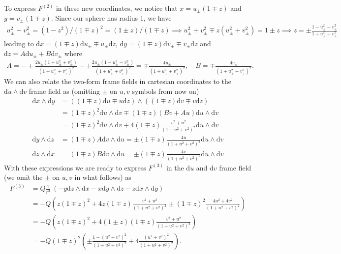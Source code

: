 \documentclass[10pt, a4paper]{article}
\begin{document}
{\begin{enumerate}
  To express $F^{(2)}$ in these new coordinates, we notice that $x = u_\pm (1\mp z)$ and $y = v_\pm (1\mp z)$. Since our sphere has radius 1, we have 
  \begin{align*}
    u^2_\pm + v_\pm^2 = (1-z^2)/(1\mp z)^2 = (1 \pm z)/(1 \mp z) \implies u^2_\pm + v_\pm^2 \mp z(u^2_\pm + v_\pm^2)  = 1 \pm z\implies  z = \pm \frac{1 - u^2_\pm - v_\pm^2}{1 + u^2_\pm + v_\pm^2}
  \end{align*}
  leading to $\text{d}x = (1\mp z) \text{d}u_\pm \mp u_\pm \text{d}z$, $\text{d}y = (1\mp z) \text{d}v_\pm \mp v_\pm \text{d}z$ and $\text{d}z = A \text{d}u_\pm + B \text{d}v_\pm$
  where 
  \begin{align*}
    A = -\pm\frac{2u_\pm (1 + u^2_\pm + v_\pm^2)}{(1 + u^2_\pm + v_\pm^2)^2}-\pm\frac{2u_\pm(1 - u^2_\pm - v_\pm^2)}{(1 + u^2_\pm + v_\pm^2)^2} = \mp\frac{4u_\pm}{(1 + u^2_\pm + v_\pm^2)^2}, \quad B = \mp\frac{4v_\pm}{(1 + u^2_\pm + v_\pm^2)^2}.
  \end{align*}
  We can also relate the two-form frame fields in cartesian coordinates to the $\text{d}u \wedge \text{d}v$ frame field as (omitting $\pm$ on $u,v$ symbols from now on)
  \begin{align*}
    \text{d}x \wedge \text{d}y &= ((1\mp z) \text{d}u \mp u\text{d}z)\wedge((1\mp z) \text{d}v \mp v \text{d}z)\\ &= (1\mp z)^2 \text{d}u \wedge \text{d}v \mp (1\mp z)(Bv + Au)\text{d}u \wedge \text{d}v\\ &= (1 \mp z)^2 \text{d}u \wedge \text{d}v + 4(1\mp z)\frac{v^2 + u^2}{(1 + u^2 + v^2)^2}\text{d}u \wedge \text{d}v\\
    \text{d}y \wedge \text{d}z &= (1\mp z) A\text{d}v \wedge \text{d}u = \pm(1\mp z)\frac{4u}{(1 + u^2 + v^2)^2}\text{d}u \wedge \text{d}v\\
    \text{d}z \wedge \text{d}x &= (1\mp z) B\text{d}v \wedge \text{d}u = \pm(1\mp z)\frac{4v}{(1 + u^2 + v^2)^2}\text{d}u \wedge \text{d}v
  \end{align*}
  With these expressions we are ready to express $F^{(3)}$ in the $\text{d}u$ and $\text{d}v$ frame field (we omit the $\pm$ on $u, v$ in what follows) as 
  \begin{align*}
    F^{(3)} &=  Q \frac{1}{r^3}\ \left(-y\text{d}z \wedge \text{d}x - x\text{d}y \wedge \text{d}z - z\text{d}x \wedge \text{d} y\right)\\
    &= -Q \left(z(1 \mp z)^2  + 4z(1\mp z)\frac{v^2 + u^2}{(1 + u^2 + v^2)^2} \pm(1\mp z)^2\frac{4u^2 + 4v^2}{(1 + u^2 + v^2)^2}\right)\\
    &=-Q \left(z(1 \mp z)^2  + 4(1\pm z)(1\mp z)\frac{v^2 + u^2}{(1 + u^2 + v^2)^2}\right)\\
    &=-Q (1 \mp z)^2\left(\pm \frac{1 - (u^2 + v^2)^2}{(1 + u^2 + v^2)^2} + 4\frac{(u^2 + v^2)^2}{(1 + u^2 + v^2)^2}\right).
  \end{align*}


\end{enumerate}}
\end{document}
